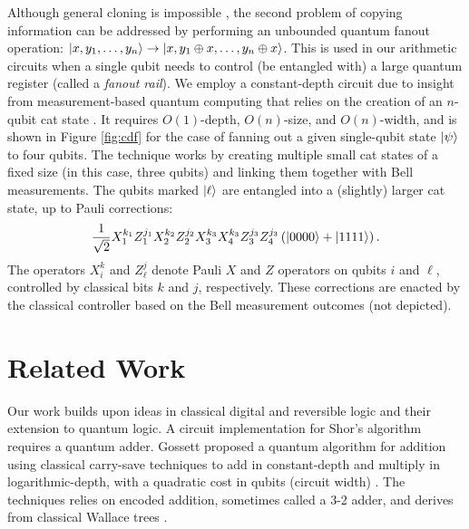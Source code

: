\documentclass[twoside]{article}
\newcommand{\normtwo}{\frac{1}{\sqrt{2}}}
\begin{document}
Although general cloning is
impossible \cite{Nielsen2000}, the second problem of copying information can be addressed by performing an unbounded quantum
fanout operation:
$\left\vert{x,y_1,\ldots,y_n}\right\rangle \rightarrow \left\vert{x,y_1\oplus x, \ldots, y_n\oplus x}\right\rangle$.
This is used in our arithmetic circuits when
a single qubit needs to control (be entangled with) a large quantum register
(called a \emph{fanout rail}).
We employ a constant-depth circuit due to insight from
measurement-based quantum computing \cite{Raussendorf2003}
that relies on the creation of an
$n$-qubit cat state \cite{Browne2009}.
It requires $O(1)$-depth, $O(n)$-size, and $O(n)$-width, and is shown in
Figure \ref{fig:cdf} for the case of fanning out a given single-qubit state $\left\vert{\psi}\right\rangle$ to
four qubits.
The technique works by creating multiple small
cat states of a fixed size (in this case, three qubits) and linking them
together with Bell measurements. The qubits marked $\left\vert{\ell}\right\rangle$ are
entangled into a (slightly) larger cat state, up to Pauli corrections:
\begin{equation}
\normtwo X_1^{k_1}Z_1^{j_1}X_2^{k_2}Z_2^{j_2}X_{3}^{k_3}X_{4}^{k_3}Z_{3}^{j_3}Z_{4}^{j_3}
\left( \ket{0000} + \ket{1111} \right).
\end{equation}
%
The operators $X^k_i$ and $Z^j_{\ell}$ denote Pauli $X$ and $Z$ operators
on qubits $i$ and $\ell$, controlled by classical bits $k$ and $j$,
respectively. These corrections are enacted by the classical controller based on
the Bell measurement outcomes (not depicted). 

%
\section{Related Work}
\label{sec:related}

Our work builds upon ideas in classical digital and reversible logic and their extension to quantum logic.
A circuit implementation for Shor's algorithm requires a quantum adder.
Gossett proposed a quantum algorithm for addition using classical carry-save techniques to add
in constant-depth and multiply in logarithmic-depth, with a quadratic
cost in qubits (circuit width) \cite{Gossett1998}. The techniques relies on encoded addition, sometimes
called a 3-2 adder, and derives from classical Wallace trees \cite{Wallace1964}.
\end{document}
